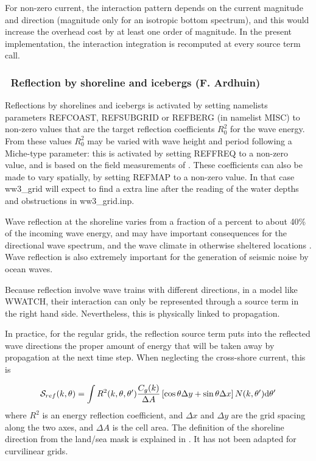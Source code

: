 For non-zero current, the interaction pattern depends on the current magnitude
and direction (magnitude only for an isotropic bottom spectrum), and this
would increase the overhead cost by at least one order of magnitude. In the
present implementation, the interaction integration is recomputed at every
source term call.

\vsssub
\subsubsection{~Reflection by shoreline and icebergs  \hfill {\rm (F. Ardhuin)}} 
\label{sec:ref}
\vsssub
Reflections by shorelines and icebergs is activated by setting namelists parameters REFCOAST, REFSUBGRID or REFBERG 
(in namelist MISC) to non-zero values that are the target reflection coefficients $R_0^2$ for the wave energy. 
From these values $R_0^2$ may be varied with wave height and period following a Miche-type parameter: this is 
activated by setting REFFREQ to a non-zero value, and is  based on the field measurements of \cite{art:EHG94}. 
These coefficients can also be made to vary spatially, by 
setting REFMAP to a non-zero value. In that case ww3\_grid will expect to find a extra line after the reading 
of the water depths and obstructions in ww3\_grid.inp. 

Wave reflection at the shoreline varies from a fraction of a percent to about 40\% of the incoming 
wave energy, and may have important consequences for the directional wave spectrum, 
and the wave climate in otherwise sheltered locations \citep{pro:ORe99}. Wave reflection is 
also extremely important for the generation of seismic noise by ocean waves.

Because reflection involve wave trains with different directions, in a model like WWATCH, their interaction can only be 
represented through a source term in the right hand side. Nevertheless, this is physically linked to propagation. 

In practice, for the regular grids, the reflection source term puts into the reflected wave directions the proper amount of energy that will be taken away by propagation 
at the next time step. When neglecting the cross-shore current, this is 

\begin{equation} 
{\cal S}_{ref}(k,\theta) = 
\int R^2(k,\theta,\theta') \frac{C_g(k)}{\Delta A} \left[\cos \theta \Delta y + \sin \theta  \Delta x \right] N(k,\theta') \mathrm{d} \theta'
\end{equation}
where $R^2$ is  an energy reflection coefficient, and $\Delta x$ and $\Delta y$ are the grid spacing along the two axes, and
$\Delta A$ is the cell area. The definition of the shoreline direction from the land/sea mask is explained in \cite{art:Aea11}. It has not 
been adapted for curvilinear grids. 

